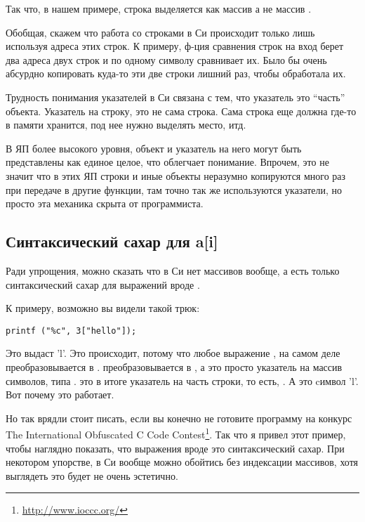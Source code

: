Так что, в нашем примере, строка выделяется как массив  а не массив .

Обобщая, скажем что работа со строками в Си происходит только лишь используя адреса этих строк. К примеру,
ф-ция сравнения строк  на вход берет два адреса двух строк и по одному символу сравнивает их.
Было бы очень абсурдно копировать куда-то эти две строки лишний раз, чтобы  обработала их.

Трудность понимания указателей в Си связана с тем, что указатель это ``часть'' объекта. Указатель на строку,
это не сама строка. Сама строка еще должна где-то в памяти хранится, под нее нужно выделять место, итд.

В ЯП более высокого уровня, объект и указатель на него могут быть представлены как единое целое, что облегчает
понимание.
Впрочем, это не значит что в этих ЯП строки и иные объекты неразумно копируются много раз при передаче 
в другие функции,
там точно так же используются указатели, но просто эта механика скрыта от программиста.

\subsection{Синтаксический сахар для a[i]}

Ради упрощения, можно сказать что в Си нет массивов вообще, а есть только синтаксический сахар для выражений
вроде .

К примеру, возможно вы видели такой трюк:

\begin{lstlisting}
printf ("%c", 3["hello"]);
\end{lstlisting}

Это выдаст 'l'. Это происходит, потому что любое выражение , на самом деле преобразовывается в .
 преобразовывается в , а  это просто указатель на массив символов, 
типа .
 это в итоге указатель на часть строки, то есть, . А  это cимвол 'l'. 
Вот почему это работает.

Но так врядли стоит писать, если вы конечно не готовите программу на конкурс 
The International Obfuscated C Code Contest\footnote{\url{http://www.ioccc.org/}}.
Так что я привел этот пример, чтобы наглядно показать, 
что выражения вроде  это синтаксический сахар.
При некотором упорстве, в Си вообще можно обойтись без индексации массивов, хотя выглядеть это будет не очень
эстетично.

